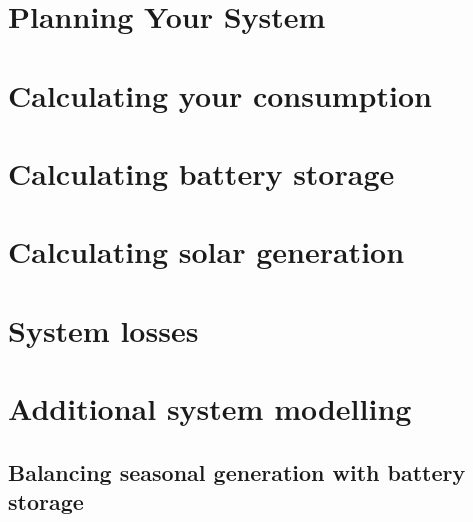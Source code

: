 \documentclass{article}
\theoremstyle{definition}
\theoremstyle{definition}
\theoremstyle{remark}
\begin{document}
  \section{Planning Your System} %
  \label{sec:planning_your_system}
  

  \section{Calculating your consumption} %
  \label{sec:calculating_your_consumption}
  

  \section{Calculating battery storage} %
  \label{sec:calculating_battery_storage}
  

  \section{Calculating solar generation} %
  \label{sec:calculating_solar_generation}
  

  \section{System losses} %
  \label{sec:system_losses}
  


\section{Additional system modelling} %
\label{sec:additional_system_modelling}

  \subsection{Balancing seasonal generation with battery storage} %
  \label{sub:balancing_seasonal_generation_with_battery_storage}
  
\end{document}
